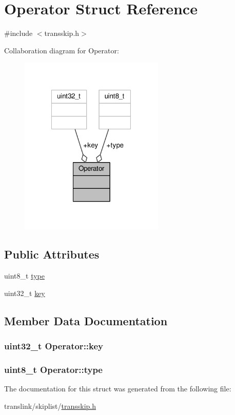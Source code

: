 \hypertarget{structOperator}{\section{Operator Struct Reference}
\label{structOperator}
}


{\ttfamily \#include $<$transskip.\-h$>$}



Collaboration diagram for Operator\-:
\nopagebreak
\begin{figure}[H]
\begin{center}
\leavevmode
\includegraphics[width=195pt]{structOperator__coll__graph}
\end{center}
\end{figure}
\subsection*{Public Attributes}
\begin{DoxyCompactItemize}
\item 
uint8\-\_\-t \hyperlink{structOperator_a080f62070dd613b378d51055e10c6666}{type}
\item 
uint32\-\_\-t \hyperlink{structOperator_a3badf2c2c57572925e2997feb6c9cc48}{key}
\end{DoxyCompactItemize}


\subsection{Member Data Documentation}
\hypertarget{structOperator_a3badf2c2c57572925e2997feb6c9cc48}{
\subsubsection[{key}]{\setlength{\rightskip}{0pt plus 5cm}uint32\-\_\-t Operator\-::key}}\label{structOperator_a3badf2c2c57572925e2997feb6c9cc48}
\hypertarget{structOperator_a080f62070dd613b378d51055e10c6666}{
\subsubsection[{type}]{\setlength{\rightskip}{0pt plus 5cm}uint8\-\_\-t Operator\-::type}}\label{structOperator_a080f62070dd613b378d51055e10c6666}


The documentation for this struct was generated from the following file\-:\begin{DoxyCompactItemize}
\item 
translink/skiplist/\hyperlink{transskip_8h}{transskip.\-h}\end{DoxyCompactItemize}
